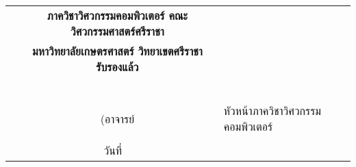 \begin{tabularx}{\textwidth}{Xc}
& \textbf{ภาควิชาวิศวกรรมคอมพิวเตอร์ คณะวิศวกรรมศาสตร์ศรีราชา}\\
& \textbf{มหาวิทยาลัยเกษตรศาสตร์ วิทยาเขตศรีราชา รับรองแล้ว}\\
& \\
& \dotfill\ \\
& (อาจารย์%
& หัวหน้าภาควิชาวิศวกรรมคอมพิวเตอร์ \\
& \\
& วันที่ \dotfill\ \\
\end{tabularx}
